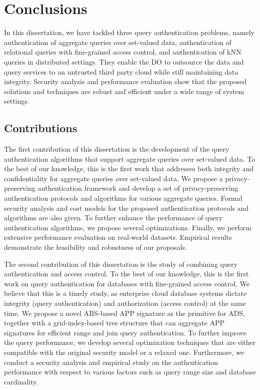 \chapter{Conclusions}\label{chap:conclusions}

In this dissertation, we have tackled three query authentication problems, namely authentication of aggregate queries over set-valued data, authentication of relational queries with fine-grained access control, and authentication of {kNN} queries in distributed settings. They enable the DO to outsource the data and query services to an untrusted third party cloud while still maintaining data integrity.
Security analysis and performance evaluation show that the proposed solutions and techniques are robust and efficient under a wide range of system settings.

\section{Contributions}

The first contribution of this dissertation is the development of the query authentication algorithms that support aggregate queries over set-valued data. To the best of our knowledge, this is the first work that addresses both integrity and confidentiality for aggregate queries over set-valued data. We propose a privacy-preserving authentication framework and develop a set of privacy-preserving authentication protocols and algorithms for various aggregate queries. Formal security analysis and cost models for the proposed authentication protocols and algorithms are also given. To further enhance the performance of query authentication algorithms, we propose several optimizations. Finally, we perform extensive performance evaluation on real-world datasets. Empirical results demonstrate the feasibility and robustness of our proposals.

The second contribution of this dissertation is the study of combining query authentication and access control. To the best of our knowledge, this is the first work on query authentication for databases with fine-grained access control. We believe that this is a timely study, as enterprise cloud database systems dictate integrity (query authentication) and authorization (access control) at the same time. We propose a novel ABS-based APP signature as the primitive for ADS, together with a grid-index-based tree structure that can aggregate APP signatures for efficient range and join query authentication. To further improve the query performance, we develop several optimization techniques that are either compatible with the original security model or a relaxed one. Furthermore, we conduct a security analysis and empirical study on the authentication performance with respect to various factors such as query range size and database cardinality.

